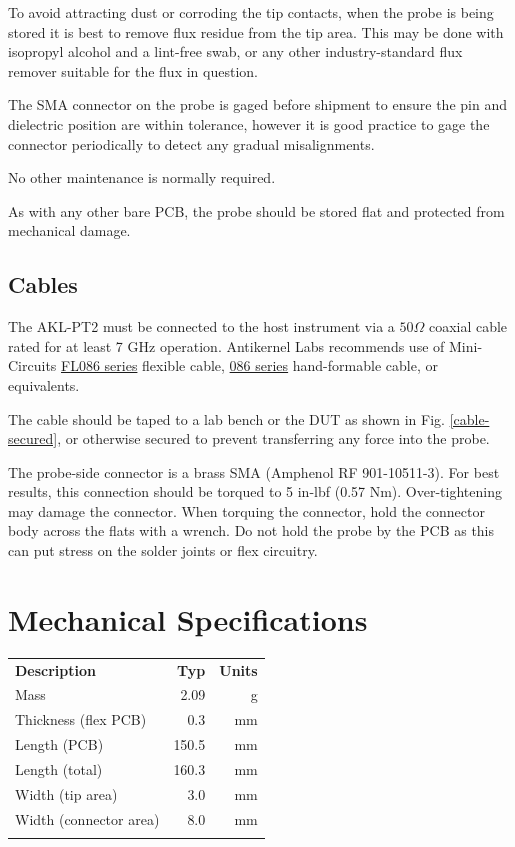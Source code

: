 \documentclass[11pt]{article}
\newcommand{\thinhline}{\Xhline{1\arrayrulewidth}}
\newcommand{\thickhline}{\Xhline{2.5\arrayrulewidth}}
\begin{document}
To avoid attracting dust or corroding the tip contacts, when the probe is being stored it is best to remove flux
residue from the tip area. This may be done with isopropyl alcohol and a lint-free swab, or any other industry-standard
flux remover suitable for the flux in question.

The SMA connector on the probe is gaged before shipment to ensure the pin and dielectric position are within tolerance,
however it is good practice to gage the connector periodically to detect any gradual misalignments.

No other maintenance is normally required.

As with any other bare PCB, the probe should be stored flat and protected from mechanical damage.

\FloatBarrier
\subsection{Cables}

The AKL-PT2 must be connected to the host instrument via a $50 \Omega$ coaxial cable rated for at least 7 GHz operation.
Antikernel Labs recommends use of Mini-Circuits \href{https://www.minicircuits.com/pdfs/FL086-24SM+.pdf}{FL086 series}
flexible cable, \href{https://www.minicircuits.com/pdfs/086-24SM+.pdf}{086 series} hand-formable cable, or equivalents.

The cable should be taped to a lab bench or the DUT as shown in Fig. \ref{cable-secured}, or otherwise secured to
prevent transferring any force into the probe.

The probe-side connector is a brass SMA (Amphenol RF 901-10511-3). For best results, this connection should be torqued
to 5 in-lbf (0.57 Nm). Over-tightening may damage the connector. When torquing the connector, hold the connector body
across the flats with a wrench. Do not hold the probe by the PCB as this can put stress on the solder joints or flex
circuitry.

\pagebreak

\section{Mechanical Specifications}

\begin{tabularx}{10cm}{Xrr}
\thickhline
\textbf{Description} & \textbf{Typ} & \textbf{Units} \\
\thickhline
Mass & 2.09 & g\\
\thinhline
Thickness (flex PCB) & 0.3 & mm\\
\thinhline
Length (PCB) & 150.5 & mm\\
\thinhline
Length (total) & 160.3 & mm\\
\thinhline
Width (tip area) & 3.0 & mm\\
\thinhline
Width (connector area) & 8.0 & mm\\
\thickhline
\end{tabularx}
\end{document}
